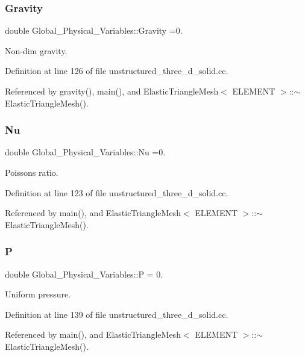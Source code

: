 \subsubsection{\texorpdfstring{Gravity}{Gravity}}
{\footnotesize\ttfamily double Global\+\_\+\+Physical\+\_\+\+Variables\+::\+Gravity =0.}



Non-\/dim gravity. 



Definition at line 126 of file unstructured\+\_\+three\+\_\+d\+\_\+solid.\+cc.



Referenced by gravity(), main(), and Elastic\+Triangle\+Mesh$<$ E\+L\+E\+M\+E\+N\+T $>$\+::$\sim$\+Elastic\+Triangle\+Mesh().

\mbox{\label{namespaceGlobal__Physical__Variables_a3962c36313826b19f216f6bbbdd6a477}} 
\subsubsection{\texorpdfstring{Nu}{Nu}}
{\footnotesize\ttfamily double Global\+\_\+\+Physical\+\_\+\+Variables\+::\+Nu =0.}



Poisson\textquotesingle{}s ratio. 



Definition at line 123 of file unstructured\+\_\+three\+\_\+d\+\_\+solid.\+cc.



Referenced by main(), and Elastic\+Triangle\+Mesh$<$ E\+L\+E\+M\+E\+N\+T $>$\+::$\sim$\+Elastic\+Triangle\+Mesh().

\mbox{\label{namespaceGlobal__Physical__Variables_a23c2ade6398f54040b869f7f3a2bcc4b}} 
\subsubsection{\texorpdfstring{P}{P}}
{\footnotesize\ttfamily double Global\+\_\+\+Physical\+\_\+\+Variables\+::P = 0.}



Uniform pressure. 



Definition at line 139 of file unstructured\+\_\+three\+\_\+d\+\_\+solid.\+cc.



Referenced by main(), and Elastic\+Triangle\+Mesh$<$ E\+L\+E\+M\+E\+N\+T $>$\+::$\sim$\+Elastic\+Triangle\+Mesh().

